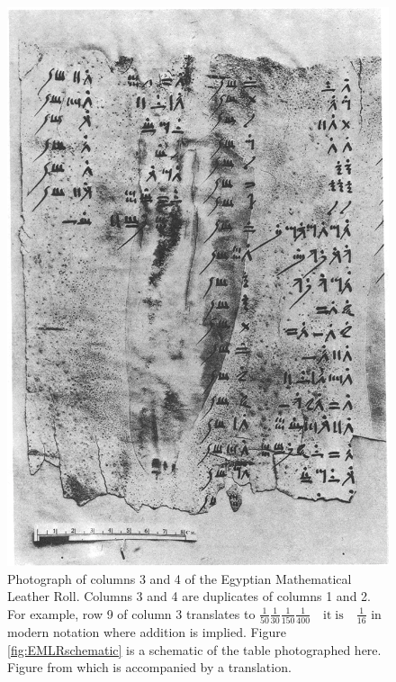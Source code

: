 \begin{figure}
  \centering
  \includegraphics[width=\textwidth]{gfx/EMLR}
  \caption[Photograph of columns 3 and 4 of the Egyptian Mathematical Leather Roll.]
  {Photograph of columns 3 and 4 of the Egyptian Mathematical Leather Roll. Columns 3 and 4 are duplicates of columns 1 and 2. For example, row 9 of column 3 translates to $\displaystyle \frac{1}{50}\frac{1}{30}\frac{1}{150}\frac{1}{400} \quad \mathrm{it \; is} \quad \frac{1}{16}$ in modern notation where addition is implied. Figure \ref{fig:EMLRschematic} is a schematic of the table photographed here. Figure from \citet{Glanville27} which is accompanied by a translation.}
  \label{fig:EMLR}
\end{figure}

